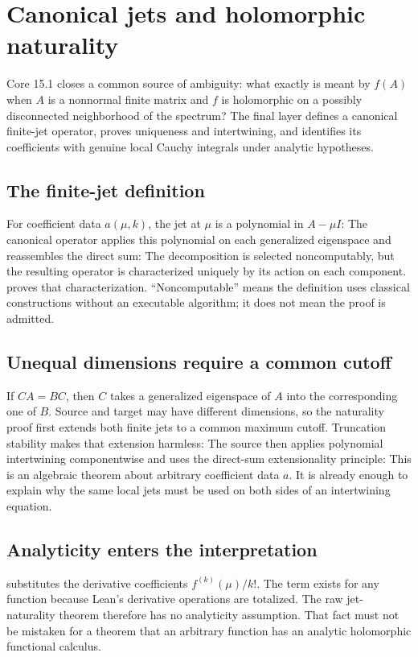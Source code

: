 \clearpage\section{Canonical jets and holomorphic naturality}
\label{sec:holomorphic}
Core 15.1 closes a common source of ambiguity: what exactly is meant by $f(A)$ when $A$ is a nonnormal finite matrix and $f$ is holomorphic on a possibly disconnected neighborhood of the spectrum? The final layer defines a canonical finite-jet operator, proves uniqueness and intertwining, and identifies its coefficients with genuine local Cauchy integrals under analytic hypotheses.

\subsection{The finite-jet definition}
For coefficient data $a(\mu,k)$, the jet at $\mu$ is a polynomial in $A-\mu I$:
The canonical operator applies this polynomial on each generalized eigenspace and reassembles the direct sum:
The decomposition is selected noncomputably, but the resulting operator is characterized uniquely by its action on each component.  proves that characterization. ``Noncomputable'' means the definition uses classical constructions without an executable algorithm; it does not mean the proof is admitted.

\subsection{Unequal dimensions require a common cutoff}
If $CA=BC$, then $C$ takes a generalized eigenspace of $A$ into the corresponding one of $B$. Source and target may have different dimensions, so the naturality proof first extends both finite jets to a common maximum cutoff. Truncation stability makes that extension harmless:
The source then applies polynomial intertwining componentwise and uses the direct-sum extensionality principle:
This is an algebraic theorem about arbitrary coefficient data $a$. It is already enough to explain why the same local jets must be used on both sides of an intertwining equation.

\subsection{Analyticity enters the interpretation}
 substitutes the derivative coefficients $f^{(k)}(\mu)/k!$. The term exists for any function because Lean's derivative operations are totalized. The raw jet-naturality theorem therefore has no analyticity assumption. That fact must not be mistaken for a theorem that an arbitrary function has an analytic holomorphic functional calculus.


